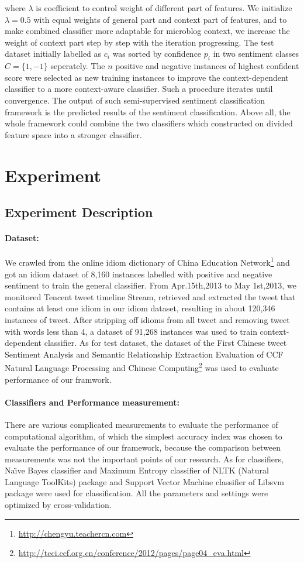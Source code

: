 \documentclass{llncs}
\begin{document}
where $ \lambda $ is coefficient to control weight of different part of features. 
We initialize $ \lambda = 0.5 $ with equal weights of general part and context part of features, and to make combined classifier more adaptable for microblog context,  we  increase the weight of context part step by step with the iteration progressing.
The test dataset initially labelled as $ c_{i} $ was sorted by confidence $ p_{i} $ in two sentiment classes $ C=\lbrace 1,-1\rbrace $ seperately.
The $ n $  positive and negative instances of highest confident score were selected as new training instances to  improve the context-dependent classifier to a more context-aware classifier. 
Such a procedure iterates until convergence.
The output of such semi-supervised sentiment classification framework is the predicted results of the sentiment classification. 
Above all, the whole framework could combine the two classifiers which constructed on divided feature space into a stronger classifier. 
\section{Experiment}
\label{experiment}
\subsection{Experiment Description}
\paragraph{Dataset:}
We crawled from the online idiom dictionary of China Education
Network\footnote{\url{http://chengyu.teachercn.com}} and got an idiom dataset of 8,160 instances labelled with positive and negative sentiment to train the general classifier. 
From Apr.15th,2013 to May 1st,2013, we monitored Tencent tweet timeline Stream, retrieved and extracted the tweet that contains at least one idiom in our idiom dataset, resulting in about 120,346 instances of tweet. 
After stripping off idioms from all tweet and removing tweet with words less than 4, a dataset of 91,268 instances was used to train context-dependent classifier. 
As for test dataset, the dataset of the First Chinese tweet Sentiment Analysis and Semantic Relationship Extraction Evaluation of CCF Natural Language Processing and Chinese Computing\footnote{\url{http://tcci.ccf.org.cn/conference/2012/pages/page04_eva.html}} was used to evaluate performance of our framwork.
\paragraph{Classifiers and Performance measurement:}
There are various complicated measurements to evaluate the performance of computational algorithm, of which the simplest accuracy index was chosen to evaluate the performance of our framework, because the comparison between measurements was not the important points of our research. 
As for classifiers, Na\"\i ve Bayes classifier and Maximum Entropy classifier of NLTK (Natural Language ToolKits)\cite{xsongx:b27} package and Support Vector Machine classifier of Libsvm\cite{xsongx:b28} package were used for classification. 
All the parameters and settings were optimized by cross-validation.
\end{document}
